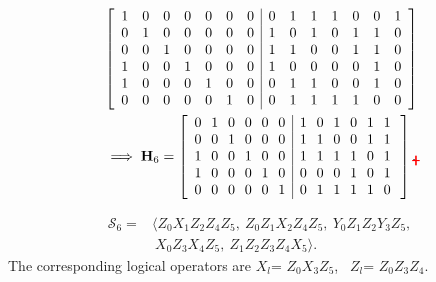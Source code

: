 \documentclass[reprint, amsmath,amssymb, aps,pra,
 floatfix,
]{revtex4-2}
\begin{document}
\begin{equation}  \scriptsize
\begin{split}
 & 
\begin{bmatrix}
\begin{array}{ccccccc|ccccccc}
    \tikz[remember picture]\node[inner sep=0pt] (a1) {1};&0&0&0&0&0&\tikz[remember picture]\node[inner sep=0pt] (a2){0}; &0&1&1&1&0&0&\tikz[remember picture]\node[inner sep=0pt] (a) {1}; \\
    0&1&0&0&0&0&0 &1&0&1&0&1&1& \tikz[remember picture]\node[inner sep=0pt] (b) {0}; \\ 
    0&0&1&0&0&0&0 &1&1&0&0&1&1& \tikz[remember picture]\node[inner sep=0pt] (c) {0}; \\
    1&0&0&1&0&0&0 &1&0&0&0&0&1&\tikz[remember picture]\node[inner sep=0pt] (d) {0}; \\
    1&0&0&0&1&0&0 &0&1&1&0&0&1&\tikz[remember picture]\node[inner sep=0pt] (e2) {0}; \\
   0&0&0&0&0&1& \tikz[remember picture]\node[inner sep=0pt] (a3){0}; 
   &0&1&1&1&1&0&\tikz[remember picture]\node[inner sep=0pt] (e) {0}; 
\end{array}
\end{bmatrix} \\ & \implies 
\mathbf{H}_6 =
\begin{bmatrix}
\begin{array}{c@{\hskip 7pt}c@{\hskip 7pt}c@{\hskip 7pt}c@{\hskip 7pt}c@{\hskip 7pt}c|c@{\hskip 7pt}c@{\hskip 7pt}c@{\hskip 7pt}c@{\hskip 7pt}c@{\hskip 7pt}c@{\hskip 7pt}c}
     0&1&0&0&0&0 &1&0&1&0&1&1\\ 
     0&0&1&0&0&0 &1&1&0&0&1&1\\
     1&0&0&1&0&0 &1&1&1&1&0&1\\
     1&0&0&0&1&0 &0&0&0&1&0&1 \\
     0&0&0&0&0&1 &0&1&1&1&1&0
\end{array}
\end{bmatrix} .
\tikz[overlay, remember picture] \draw[red, thick] (a.north) -- (e.south);
\tikz[overlay, remember picture] \draw[red, thick] (a1.west) -- (a.east);
\tikz[overlay, remember picture] \draw[red, thick] (a2.north) -- (a3.south);
\end{split}
\label{eq: matrix after measurement}
\end{equation}

\begin{equation}
\begin{split}
    \mathcal{S}_6 = & \langle  Z_0X_1Z_2Z_4Z_5,\ Z_0Z_1X_2Z_4Z_5,\ Y_0Z_1Z_2Y_3Z_5,\\ & \ X_0Z_3X_4Z_5,\ Z_1Z_2Z_3Z_4X_5 \rangle.
\end{split}
\label{eq: stabilizer [[6,1,3]]}
\end{equation}
The corresponding logical operators are $X_l$= $Z_0X_3Z_5$, \, $Z_l$= $Z_0Z_3Z_4$.
\end{document}
